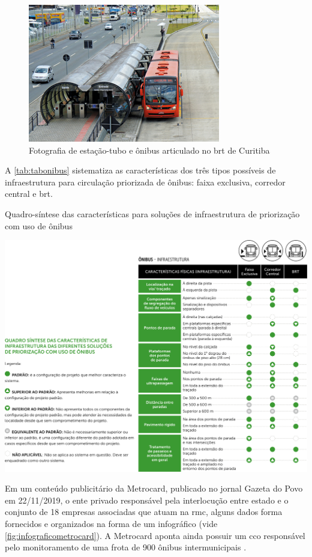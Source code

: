 	\begin{figure}
		\centering
		\caption{Fotografia de estação-tubo e ônibus articulado no \gls{brt} de Curitiba}
		\label{fig:brtsul}
		\includegraphics[width=0.55\linewidth]{img/guiatpc2018a_03}
	\end{figure}

	A \autoref{tab:tabonibus} sistematiza as características dos três tipos possíveis de infraestrutura para circulação priorizada de ônibus: faixa exclusiva, corredor central e \gls{brt}.
	
	\begin{landscape}
		\begin{table}
			\centering
			\caption{Quadro-síntese das características para soluções de infraestrutura de priorização com uso de ônibus}
			\label{tab:tabonibus}
			\includegraphics[width=0.75\linewidth]{img/guiatpc2018a_02}
		\end{table}
	\end{landscape}

	Em um conteúdo publicitário da Metrocard, publicado no jornal Gazeta do Povo em 22/11/2019, o ente privado responsável pela interlocução entre estado e o conjunto de 18 empresas associadas que atuam na \gls{rmc}, alguns dados forma fornecidos e organizados na forma de um infográfico (vide \autoref{fig:infograficometrocard}). A Metrocard aponta ainda possuir um \gls{cco} responsável pelo monitoramento de uma frota de 900 ônibus intermunicipais \cite{boreki2019a}.
	

